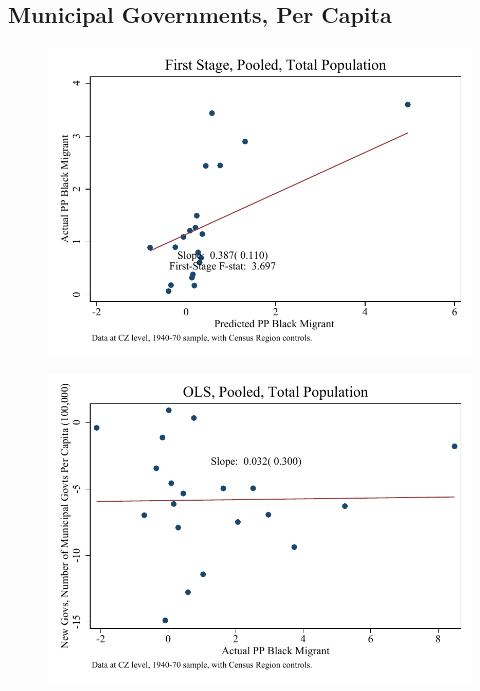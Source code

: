 \documentclass{article}
\begin{document}
\subsection{Municipal Governments, Per Capita}

\clearpage
\begin{figure}
\centering
\includegraphics{figures/simplefigs/pooled_gen_muni_pc_C3_total_fs.pdf}
\end{figure}
\clearpage
\begin{figure}
\centering
\includegraphics{figures/simplefigs/pooled_gen_muni_pc_C3_total_ols.pdf}
\end{figure}
\clearpage
\end{document}
